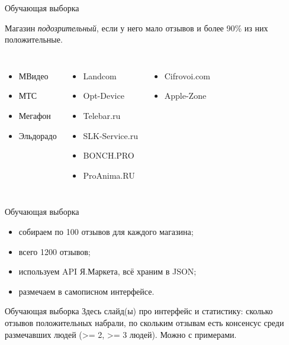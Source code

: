 \documentclass[mathserif,utf8,14pt]{beamer}
\begin{document}
\begin{frame}{Обучающая выборка}
     \addtocounter{framenumber}{-1}
    Магазин \textit{подозрительный}, если у него мало отзывов и более 
    90\% из них положительные.
    \begin{columns}
        \begin{itemize}
            \item МВидео 
            \item МТС 
            \item Мегафон 
            \item Эльдорадо 
        \end{itemize}
        \begin{itemize}
            \item Landcom 
            \item Opt-Device  
            \item Telebar.ru 
            \item SLK-Service.ru 
            \item BONCH.PRO 
            \item ProAnima.RU 
        \end{itemize}
        \begin{itemize}
            \item Cifrovoi.com
            \item Apple-Zone
        \end{itemize}
    \end{columns}
\end{frame}

\begin{frame}{Обучающая выборка}
     \addtocounter{framenumber}{-1}
     \begin{itemize}
         \item собираем по 100 отзывов для каждого магазина;
         \item всего 1200 отзывов;
         \item используем API Я.Маркета, всё храним в JSON;
         \item размечаем в самописном интерфейсе.
     \end{itemize}
\end{frame}

\begin{frame}{Обучающая выборка}
     Здесь слайд(ы) про интерфейс и статистику: сколько отзывов положительных
     набрали, по скольким отзывам есть консенсус среди размечавших людей 
     (>= 2, >= 3 людей).
     Можно с примерами.
\end{frame}
\end{document}
